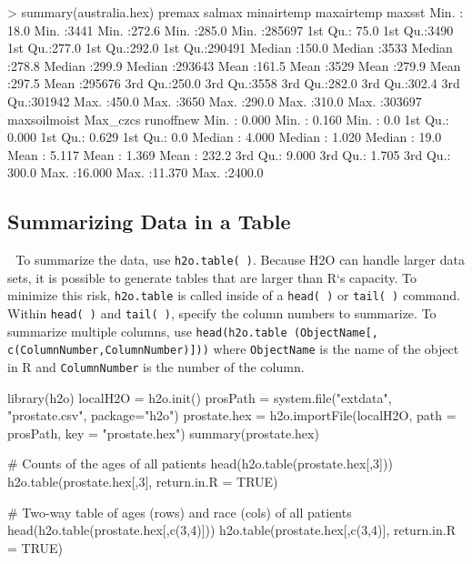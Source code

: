 \documentclass[11pt]{article}
\begin{document}
\begin{spverbatim}
> summary(australia.hex)
 premax          salmax         minairtemp      maxairtemp      maxsst          
 Min.   : 18.0   Min.   :3441   Min.   :272.6   Min.   :285.0   Min.   :285697  
 1st Qu.: 75.0   1st Qu.:3490   1st Qu.:277.0   1st Qu.:292.0   1st Qu.:290491  
 Median :150.0   Median :3533   Median :278.8   Median :299.9   Median :293643  
 Mean   :161.5   Mean   :3529   Mean   :279.9   Mean   :297.5   Mean   :295676  
 3rd Qu.:250.0   3rd Qu.:3558   3rd Qu.:282.0   3rd Qu.:302.4   3rd Qu.:301942  
 Max.   :450.0   Max.   :3650   Max.   :290.0   Max.   :310.0   Max.   :303697  
 maxsoilmoist     Max_czcs         runoffnew       
 Min.   : 0.000   Min.   : 0.160   Min.   :   0.0  
 1st Qu.: 0.000   1st Qu.: 0.629   1st Qu.:   0.0  
 Median : 4.000   Median : 1.020   Median :  19.0  
 Mean   : 5.117   Mean   : 1.369   Mean   : 232.2  
 3rd Qu.: 9.000   3rd Qu.: 1.705   3rd Qu.: 300.0  
 Max.   :16.000   Max.   :11.370   Max.   :2400.0  
\end{spverbatim}


\subsection{Summarizing Data in a Table} 
To summarize the data, use {\texttt{h2o.table( )}}. Because H2O can handle larger data sets, it is possible to generate tables that are larger than R`s capacity. To minimize this risk, {\texttt{h2o.table}} is called inside of a {\texttt{head( )}} or {\texttt{tail( )}} command. Within {\texttt{head( )}}  and {\texttt{tail( )}}, specify the column numbers to summarize. 
To summarize multiple columns, use {\texttt{head(h2o.table (ObjectName[, c(ColumnNumber,ColumnNumber)]))}} where {\texttt{ObjectName}} is the name of the object in R and {\texttt{ColumnNumber}} is the number of the column. 

\begin{spverbatim}
library(h2o)
localH2O = h2o.init()
prosPath = system.file("extdata", "prostate.csv", package="h2o")
prostate.hex = h2o.importFile(localH2O, path = prosPath, key = "prostate.hex")
summary(prostate.hex)

# Counts of the ages of all patients
head(h2o.table(prostate.hex[,3]))
h2o.table(prostate.hex[,3], return.in.R = TRUE)

# Two-way table of ages (rows) and race (cols) of all patients
head(h2o.table(prostate.hex[,c(3,4)]))
h2o.table(prostate.hex[,c(3,4)], return.in.R = TRUE)
\end{spverbatim}
\end{document}
